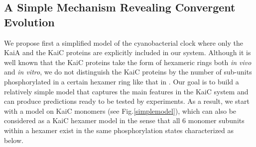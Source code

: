 \documentclass[a4paper,10pt]{article}
\numberwithin{equation}{section}
\begin{document}









\subsection{A Simple Mechanism Revealing Convergent Evolution}
We propose first a simplified model of the cyanobacterial clock where only the KaiA and the KaiC proteins are explicitly included in our system. Although it is well known that the KaiC proteins take the form of hexameric rings both \textit{in vivo} and \textit{in
vitro}, we do not distinguish the KaiC proteins by the number of sub-units phosphorylated in a certain hexamer ring like that in \citet{van2007}. Our goal is to build a relatively simple model that captures the main features in the KaiC system and can produce predictions ready to be tested by experiments. As a result, we start with a model on KaiC monomers (see Fig.\ref{simplemodel}), which can also be considered as a KaiC hexamer model in the sense that all 6 monomer subunits within a hexamer exist in the same phosphorylation states characterized as below.
\end{document}
